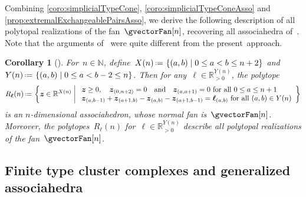 \documentclass{amsart}
\newtheorem{corollary}[theorem]{Corollary}
\theoremstyle{definition}
\newcommand{\R}{\mathbb{R}} %
\newcommand{\N}{\mathbb{N}} %
\renewcommand{\b}[1]{{\boldsymbol{#1}}} %
\newcommand{\set}[2]{\left\{ #1 \;\middle|\; #2 \right\}} %
\newcommand{\eqdef}{\mbox{\,\raisebox{0.2ex}{\scriptsize\ensuremath{\mathrm:}}\ensuremath{=}\,}} %
\newcommand{\vincent}[1]{\todo[color=blue!30]{#1 \\ \hfill --- V.}}
\begin{document}
\enlargethispage{.2cm}
Combining \cref{coro:simplicialTypeCone}, \cref{coro:simplicialTypeConeAsso} and \cref{prop:extremalExchangeablePairsAsso}, we derive the following description of all polytopal realizations of the fan~$\gvectorFan[n]$, recovering all associahedra of~\cite[Sect.~3.2]{ArkaniHamedBaiHeYan}.
Note that the arguments of~\cite[Sect.~3.2]{ArkaniHamedBaiHeYan} were quite different from the present~approach.

\begin{corollary}[{\cite[Sect.~3.2]{ArkaniHamedBaiHeYan}}]
\label{coro:allPolytopalRealizationsAsso}
For~$n \in \N$, define~$X(n) \eqdef \set{(a,b)}{0 \le a < b \le n+2}$ and~$Y(n) \eqdef \set{(a,b)}{0 \le a < b-2 \le n}$.
Then for any~$\b{\ell} \in \R_{>0}^{Y(n)}$, the polytope
\[
R_\b{\ell}(n) \eqdef \set{\b{z} \in \R^{X(n)}}{\begin{array}{l} \b{z} \ge 0, \quad \b{z}_{(0,n+2)} = 0 \quad\text{and}\quad \b{z}_{(a,a+1)} = 0 \text{ for all } 0 \le a \le n+1 \\ \b{z}_{(a,b-1)} + \b{z}_{(a+1,b)} - \b{z}_{(a,b)} - \b{z}_{(a+1,b-1)} = \b{\ell}_{(a,b)} \text{ for all } (a,b) \in Y(n) \end{array}}
\]
is an $n$-dimensional associahedron, whose normal fan is~$\gvectorFan[n]$.
Moreover, the polytopes~$R_\b{\ell}(n)$ for~$\b{\ell} \in \R_{>0}^{Y(n)}$ describe all polytopal realizations of the fan~$\gvectorFan[n]$.
\end{corollary}



\subsection{Finite type cluster complexes and generalized associahedra}
\label{subsec:typeConeCA}
\end{document}
